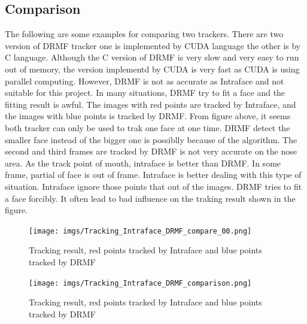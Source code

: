 \subsection{Comparison}
The following are some examples for comparing two trackers. There are two version of DRMF tracker one is implemented by CUDA language the other is by C language. Although the C version of DRMF is very slow and very easy to run out of memory, the version implementd by CUDA is very fast as CUDA is using parallel computing. However, DRMF is not as accurate as Intraface and not suitable for this project. In many situations, DRMF try to fit a face and the fitting result is awful. The images with red points are tracked by Intraface, and the images with blue points is tracked by DRMF.
\newline
From figure above, it seems both tracker can only be used to trak one face at one time. DRMF detect the smaller face instead of the bigger one is possiblly because of the algorithm. The second and third frames are tracked by DRMF is not very accurate on the nose area. As the track point of mouth, intraface is better than DRMF.
In some frame, partial of face is out of frame. Intraface is better dealing with this type of situation. Intraface ignore those points that out of the images. DRMF tries to fit a face forcibly. It often lead to bad influence on the traking result shown in the figure.
\begin{figure}[p]
\centering
\texttt{[image: imgs/Tracking\_Intraface\_DRMF\_compare\_00.png]}
\caption{Tracking result, red points tracked by Intraface and blue points tracked by DRMF}
\texttt{[image: imgs/Tracking\_Intraface\_DRMF\_comparison.png]}
\caption{Tracking result, red points tracked by Intraface and blue points tracked by DRMF}
\end{figure}
\newpage
